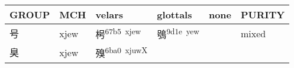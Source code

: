 \documentclass[14pt,a4paper]{scrartcl}
\begin{document}
\begin{longtable}[c]{@{}llllll@{}}
\toprule
\begin{minipage}[b]{0.14\columnwidth}\raggedright\strut
GROUP
\strut\end{minipage} &
\begin{minipage}[b]{0.14\columnwidth}\raggedright\strut
MCH
\strut\end{minipage} &
\begin{minipage}[b]{0.14\columnwidth}\raggedright\strut
velars
\strut\end{minipage} &
\begin{minipage}[b]{0.14\columnwidth}\raggedright\strut
glottals
\strut\end{minipage} &
\begin{minipage}[b]{0.14\columnwidth}\raggedright\strut
none
\strut\end{minipage} &
\begin{minipage}[b]{0.14\columnwidth}\raggedright\strut
PURITY
\strut\end{minipage}\tabularnewline
\midrule
\endhead
\begin{minipage}[t]{0.14\columnwidth}\raggedright\strut
号
\strut\end{minipage} &
\begin{minipage}[t]{0.14\columnwidth}\raggedright\strut
xjew
\strut\end{minipage} &
\begin{minipage}[t]{0.14\columnwidth}\raggedright\strut
枵\textsuperscript{67b5~xjew}
\strut\end{minipage} &
\begin{minipage}[t]{0.14\columnwidth}\raggedright\strut
鴞\textsuperscript{9d1e~yew}
\strut\end{minipage} &
\begin{minipage}[t]{0.14\columnwidth}\raggedright\strut
\strut\end{minipage} &
\begin{minipage}[t]{0.14\columnwidth}\raggedright\strut
mixed
\strut\end{minipage}\tabularnewline
\begin{minipage}[t]{0.14\columnwidth}\raggedright\strut
臭
\strut\end{minipage} &
\begin{minipage}[t]{0.14\columnwidth}\raggedright\strut
xjew
\strut\end{minipage} &
\begin{minipage}[t]{0.14\columnwidth}\raggedright\strut
殠\textsuperscript{6ba0~xjuwX}

\end{minipage}
\end{longtable}
\end{document}

